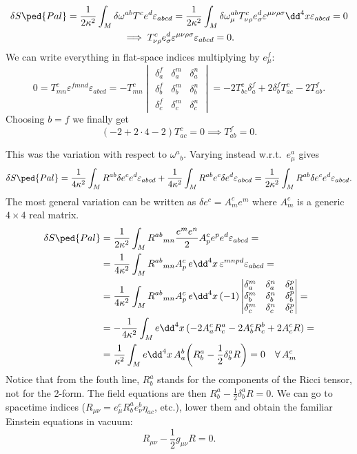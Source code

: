 \documentclass[a4paper,12pt]{book}
\begin{document}
\begin{gather*}\delta S\ped{Pal}=\frac{1}{2\kappa^2}\int_M\delta\omega^{ab}T^ce^d\varepsilon_{abcd}=\frac{1}{2\kappa^2}\int_M\delta\omega_\mu^{ab}T_{\nu\rho}^ce^d_\sigma\varepsilon^{\mu\nu\rho\sigma}\dd^4x\varepsilon_{abcd}=0\\
\implies T_{\nu\rho}^ce^d_\sigma\varepsilon^{\mu\nu\rho\sigma}\varepsilon_{abcd}=0.
\end{gather*}
We can write everything in flat-space indices multiplying by $e^f_\mu$:
\[0=T^c_{mn}\varepsilon^{fmnd}\varepsilon_{abcd}=-T^c_{mn}
\begin{vmatrix}
\delta^f_a & \delta^m_a & \delta^n_a \\
\delta^f_b & \delta^m_b & \delta^n_b \\
\delta^f_c & \delta^m_c & \delta^n_c
\end{vmatrix}
=-2T^c_{bc}\delta^f_a+2\delta^f_bT^c_{ac}-2T^f_{ab}.
\]
Choosing $b=f$ we finally get
\[(-2+2\cdot4-2)T^c_{ac}=0\implies T^f_{ab}=0.\]

This was the variation with respect to $\omega^a{}_b$. Varying instead w.r.t.~$e^a_\mu$ gives
\[\delta S\ped{Pal}=\frac{1}{4\kappa^2}\int_MR^{ab}\delta e^ce^d\varepsilon_{abcd}+\frac{1}{4\kappa^2}\int_MR^{ab} e^c\delta e^d\varepsilon_{abcd}=\frac{1}{2\kappa^2}\int_MR^{ab}\delta e^ce^d\varepsilon_{abcd}.\]
The most general variation can be written as $\delta e^c=A^c_me^m$ where $A^c_m$ is a generic $4\times4$ real matrix.
\begin{align*}
\delta S\ped{Pal}&=\frac{1}{2\kappa^2}\int_MR^{ab}{}_{mn}\frac{e^me^n}{2}A^c_pe^pe^d\varepsilon_{abcd}=\\
&=\frac{1}{4\kappa^2}\int_MR^{ab}{}_{mn}A^c_p\,e\dd^4x\,\varepsilon^{mnpd}\varepsilon_{abcd}=\\
&=\frac{1}{4\kappa^2}\int_MR^{ab}{}_{mn}A^c_p\,e\dd^4x\,(-1)
\begin{vmatrix}
\delta^m_a & \delta^n_a & \delta^p_a \\
\delta^m_b & \delta^n_b & \delta^p_b \\
\delta^m_c & \delta^n_c & \delta^p_c
\end{vmatrix}=\\
&=-\frac{1}{4\kappa^2}\int_Me\dd^4x\,(-2A^c_aR^a_c-2A^c_bR^b_c+2A^c_cR)=\\
&=\frac{1}{\kappa^2}\int_Me\dd^4x\,A^b_a\biggl(R^a_b-\frac{1}{2}\delta^a_bR\biggr)=0\quad\forall\,A^c_m\\
\end{align*}
Notice that from the fouth line, $R^a_b$ stands for the components of the Ricci tensor, not for the 2-form. The field equations are then $R^a_b-\frac{1}{2}\delta^a_bR=0$. We can go to spacetime indices ($R_{\mu\nu}=e^c_\mu R^a_be^b_\nu\eta_{ac}$, etc.), lower them and obtain the familiar Einstein equations in vacuum:
\[R_{\mu\nu}-\frac{1}{2}g_{\mu\nu}R=0.\]
\end{document}
